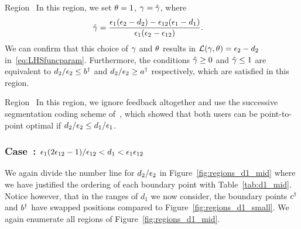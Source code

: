 \begin{LaTeXdescription}
	\item[Region~\Rmnum{2}]  In this region, we set $\theta= 1$, $\gamma = \hat{\gamma}$, where
		\begin{align}
			\hat{\gamma} &= \frac{\epsilon_1(\epsilon_2 - d_2) - \epsilon_{12}(\epsilon_1 - d_1)}{\epsilon_1(\epsilon_2 - \epsilon_{12})}.
			\label{eq:gammahat}
		\end{align}
		We can confirm that this choice of $\gamma$ and $\theta$ results in $\mathcal{L}(\gamma, \theta) = \epsilon_2 - d_2$ in~\eqref{eq:LHSfuncparam}.  Furthermore, the conditions $\hat{\gamma} \geq 0$ and $\hat{\gamma} \leq 1$ are equivalent to $d_2/\epsilon_2 \leq b^{\dagger}$ and $d_2/\epsilon_2 \geq a^{\dagger}$ respectively, which are satisfied in this region.%
	
	\item[Region~\Rmnum{1}]  In this region, we ignore feedback altogether and use the successive segmentation coding scheme of~\cite{TLKS_TIT16}, which showed that both users can be point-to-point optimal if $d_2/\epsilon_2 \leq d_1/\epsilon_1$.
\end{LaTeXdescription}



\subsubsection{Case~: $\epsilon_1 (2\epsilon_{12} - 1)/\epsilon_{12} < d_1 < \epsilon_1\epsilon_{12}$}

We again divide the number line for $d_2/\epsilon_2$ in Figure~\ref{fig:regions_d1_mid} where we have justified the ordering of each boundary point with Table~\ref{tab:d1_mid}.  Notice however, that in the ranges of $d_1$ we now consider, the boundary points $c^{\dagger}$ and $b^{\dagger}$ have swapped positions compared to Figure~\ref{fig:regions_d1_small}.  We again enumerate all regions of Figure~\ref{fig:regions_d1_mid}.

